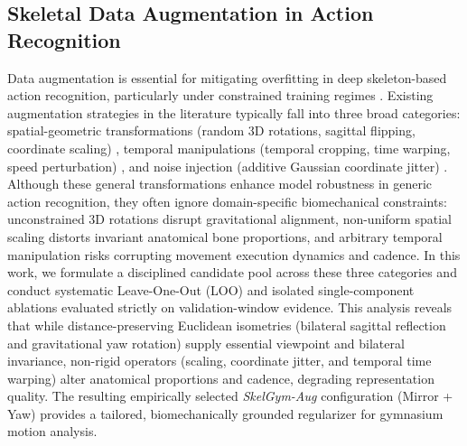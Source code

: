 \documentclass[preprint,12pt]{elsarticle}
\begin{document}
\subsection{Skeletal Data Augmentation in Action Recognition}
Data augmentation is essential for mitigating overfitting in deep skeleton-based action recognition, particularly under constrained training regimes \cite{yan2018,shi2020skeleton}.
Existing augmentation strategies in the literature typically fall into three broad categories: spatial-geometric transformations (random 3D rotations, sagittal flipping, coordinate scaling) \cite{yan2018,shi2020skeleton}, temporal manipulations (temporal cropping, time warping, speed perturbation) \cite{song2023constructing}, and noise injection (additive Gaussian coordinate jitter) \cite{xin2024augmentation}.
Although these general transformations enhance model robustness in generic action recognition, they often ignore domain-specific biomechanical constraints: unconstrained 3D rotations disrupt gravitational alignment, non-uniform spatial scaling distorts invariant anatomical bone proportions, and arbitrary temporal manipulation risks corrupting movement execution dynamics and cadence. 
In this work, we formulate a disciplined candidate pool across these three categories and conduct systematic Leave-One-Out (LOO) and isolated single-component ablations evaluated strictly on validation-window evidence. This analysis reveals that while distance-preserving Euclidean isometries (bilateral sagittal reflection and gravitational yaw rotation) supply essential viewpoint and bilateral invariance, non-rigid operators (scaling, coordinate jitter, and temporal time warping) alter anatomical proportions and cadence, degrading representation quality. The resulting empirically selected \textit{SkelGym-Aug} configuration (Mirror + Yaw) provides a tailored, biomechanically grounded regularizer for gymnasium motion analysis.
\end{document}
